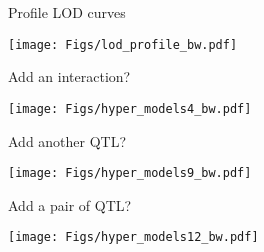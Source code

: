 \documentclass[12pt]{article}
\newcommand{\headsize}{\fontsize{35}{35} \selectfont}
\newcommand{\smallersize}{\fontsize{20}{25} \selectfont}
\begin{document}
\newpage

\headsize \color{myyellow}
\hfill \begin{minipage}{5.75in}
\centering
Profile LOD curves
\end{minipage}

\vfill


\centerline{\texttt{[image: Figs/lod\_profile\_bw.pdf]}}


\newpage

\addtocounter{page}{+1}


\headsize \color{myyellow}
\hfill \begin{minipage}{5.75in}
\centering
Add an interaction?
\end{minipage}

\vfill


\centerline{\texttt{[image: Figs/hyper\_models4\_bw.pdf]}}






\newpage


\headsize \color{myyellow}
\hfill \begin{minipage}{5.75in}
\centering
Add another QTL?
\end{minipage}

\vfill


\centerline{\texttt{[image: Figs/hyper\_models9\_bw.pdf]}}



\newpage



\headsize \color{myyellow}
\hfill \begin{minipage}{5.75in}
\centering
Add a pair of QTL?
\end{minipage}

\vfill


\centerline{\texttt{[image: Figs/hyper\_models12\_bw.pdf]}}






%
%
%
%
%
\end{document}
